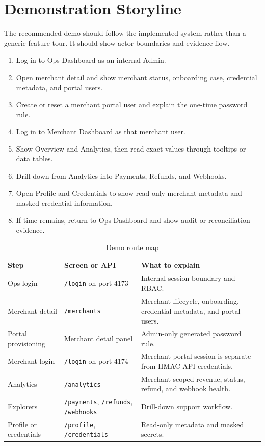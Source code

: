 \chapter{Demonstration Storyline}

The recommended demo should follow the implemented system rather than a generic
feature tour. It should show actor boundaries and evidence flow.

\begin{enumerate}
  \item Log in to Ops Dashboard as an internal Admin.
  \item Open merchant detail and show merchant status, onboarding case,
  credential metadata, and portal users.
  \item Create or reset a merchant portal user and explain the one-time
  password rule.
  \item Log in to Merchant Dashboard as that merchant user.
  \item Show Overview and Analytics, then read exact values through tooltips or
  data tables.
  \item Drill down from Analytics into Payments, Refunds, and Webhooks.
  \item Open Profile and Credentials to show read-only merchant metadata and
  masked credential information.
  \item If time remains, return to Ops Dashboard and show audit or
  reconciliation evidence.
\end{enumerate}

\begin{table}[H]
\centering
\caption{Demo route map}
\begin{tabularx}{\textwidth}{L{0.25\textwidth}L{0.27\textwidth}Y}
\toprule
\textbf{Step} & \textbf{Screen or API} & \textbf{What to explain} \\
\midrule
Ops login & \texttt{/login} on port 4173 & Internal session boundary and RBAC. \\
Merchant detail & \texttt{/merchants} & Merchant lifecycle, onboarding, credential metadata, and portal users. \\
Portal provisioning & Merchant detail panel & Admin-only generated password rule. \\
Merchant login & \texttt{/login} on port 4174 & Merchant portal session is separate from HMAC API credentials. \\
Analytics & \texttt{/analytics} & Merchant-scoped revenue, status, refund, and webhook health. \\
Explorers & \texttt{/payments}, \texttt{/refunds}, \texttt{/webhooks} & Drill-down support workflow. \\
Profile or credentials & \texttt{/profile}, \texttt{/credentials} & Read-only metadata and masked secrets. \\
\bottomrule
\end{tabularx}
\end{table}
